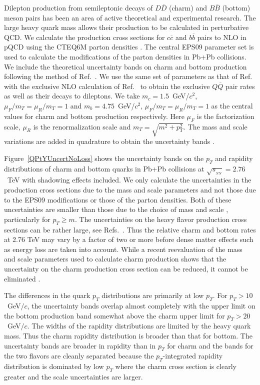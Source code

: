 Dilepton production from semileptonic decays of $D\overline D$ (charm) and 
$B\overline B$ (bottom) meson pairs has been an area of active theoretical 
\cite{GAVIN,LIN,SHUR,FEIN,MUST} and experimental \cite{RHICSingleEl} research. 
The large heavy quark mass allows their production to be calculated in 
perturbative QCD.  We calculate the production cross sections for 
$c\overline c$ and  $b\overline b$ pairs to NLO in pQCD \cite{GAVIN,LIN} using
the CTEQ6M parton densities \cite{CTEQ6}.  The central EPS09 parameter set 
\cite{EPS09} is used to calculate the modifications of the parton densities in 
Pb+Pb collisions.  
We include the theoretical uncertainty bands on charm and bottom production
following the method of Ref.~\cite{CNV}.  We use the same set of parameters
as that of Ref.~\cite{CNV} with the exclusive NLO calculation of Ref.~\cite{MNR}
to obtain the exclusive $Q \overline Q$ pair rates as well as their decays
to dileptons.  We take $m_c = 1.5$~GeV/$c^2$, $\mu_F/m_T = \mu_R/m_T = 1$ and  
$m_b = 4.75$~GeV/$c^2$, $\mu_F/m_T = \mu_R/m_T = 1$ as the central values for
charm and bottom production respectively.  Here $\mu_F$ is the factorization 
scale, $\mu_R$ is the renormalization scale and $m_T = \sqrt{m^2 + p_T^2}$.  
The mass and scale variations are added in quadrature to obtain the uncertainty
bands \cite{CNV}.  

Figure~\ref{QPtYUncertNoLoss} shows the uncertainty bands on the $p_T$ 
and rapidity distributions of charm and bottom quarks in Pb+Pb collisions
at $\sqrt{s_{_{NN}}} = 2.76$~TeV with shadowing effects included.  We only
calculate the uncertainties in the production cross sections due to the
mass and scale parameters and not those due to the EPS09 modifications or those
of the parton densities.  Both of these uncertainties are smaller than those
due to the choice of mass and scale \cite{NVF}, particularly for $p_T \geq m$.  
The uncertainties on the heavy flavor production cross sections can be rather
large, see Refs.~\cite{RVjoszo,RVHP08}.  Thus the relative charm and bottom 
rates at 2.76 TeV may vary by a factor of two or more before dense matter
effects such as energy loss are taken into account.  While a recent reevaluation
of the mass and scale parameters used to calculate charm production shows
that the uncertainty on the charm production cross section can be reduced, it 
cannot be eliminated \cite{NVF}.  

The differences in the quark $p_T$ distributions are
primarily at low $p_T$.  For $p_T > 10$~GeV$/c$, the uncertainty bands overlap
almost completely with the upper limit on the bottom production band somewhat
above the charm upper limit for $p_T > 20$~GeV$/c$.
The widths of the rapidity distributions are limited by the heavy quark mass.  
Thus the charm rapidity distribution is broader than that for bottom. 
The uncertainty bands are broader in rapidity than in $p_T$ for charm and the
bands for the two flavors are cleanly separated
because the $p_T$-integrated rapidity distribution is dominated by low $p_T$
where the charm cross section is clearly greater and the scale uncertainties
are larger.


